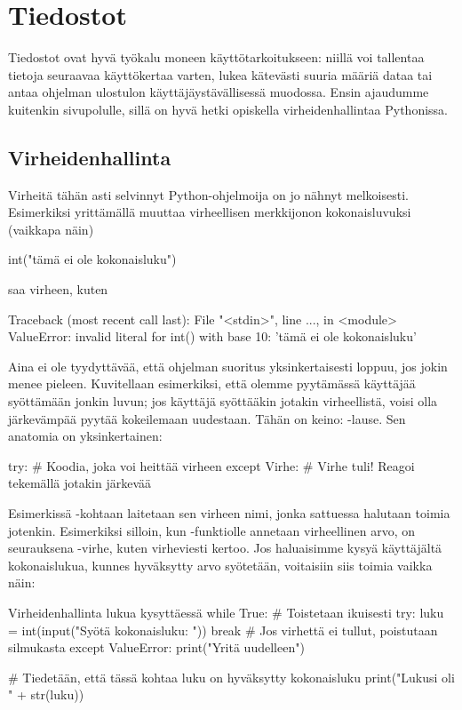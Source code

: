 \chapter{Tiedostot}

Tiedostot ovat hyvä työkalu moneen käyttötarkoitukseen: niillä voi tallentaa tietoja seuraavaa käyttökertaa varten, lukea kätevästi suuria määriä dataa tai antaa ohjelman ulostulon käyttäjäystävällisessä muodossa. Ensin ajaudumme kuitenkin sivupolulle, sillä on hyvä hetki opiskella virheidenhallintaa Pythonissa.

\section{Virheidenhallinta}

Virheitä tähän asti selvinnyt Python-ohjelmoija on jo nähnyt melkoisesti. Esimerkiksi yrittämällä muuttaa virheellisen merkkijonon kokonaisluvuksi (vaikkapa näin)

\begin{python}
int("tämä ei ole kokonaisluku")
\end{python}

saa virheen, kuten

\begin{output}
Traceback (most recent call last):
  File "<stdin>", line ..., in <module>
ValueError: invalid literal for int() with base 10: 'tämä ei ole kokonaisluku'
\end{output}

Aina ei ole tyydyttävää, että ohjelman suoritus yksinkertaisesti loppuu, jos jokin menee pieleen. Kuvitellaan esimerkiksi, että olemme pyytämässä käyttäjää syöttämään jonkin luvun; jos käyttäjä syöttääkin jotakin virheellistä, voisi olla järkevämpää pyytää kokeilemaan uudestaan. Tähän on keino: -lause. Sen anatomia on yksinkertainen:

\begin{python}
try:
	# Koodia, joka voi heittää virheen
except Virhe:
	# Virhe tuli! Reagoi tekemällä jotakin järkevää
\end{python}

Esimerkissä -kohtaan laitetaan sen virheen nimi, jonka sattuessa halutaan toimia jotenkin. Esimerkiksi silloin, kun -funktiolle annetaan virheellinen arvo, on seurauksena -virhe, kuten virheviesti kertoo. Jos haluaisimme kysyä käyttäjältä kokonaislukua, kunnes hyväksytty arvo syötetään, voitaisiin siis toimia vaikka näin:

\begin{example}{Virheidenhallinta lukua kysyttäessä}
while True: # Toistetaan ikuisesti
	try:
		luku = int(input("Syötä kokonaisluku: "))
		break # Jos virhettä ei tullut, poistutaan silmukasta
	except ValueError:
		print("Yritä uudelleen")

# Tiedetään, että tässä kohtaa luku on hyväksytty kokonaisluku
print("Lukusi oli " + str(luku))
\end{example}

